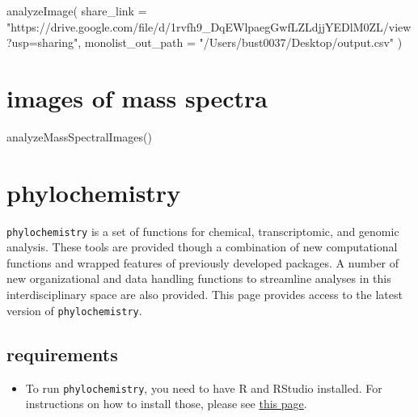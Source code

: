\documentclass[
]{krantz}
\newenvironment{Shaded}{\begin{snugshade}}{\end{snugshade}}
\newcommand{\AttributeTok}[1]{\textcolor[rgb]{0.77,0.63,0.00}{#1}}
\newcommand{\FunctionTok}[1]{\textcolor[rgb]{0.00,0.00,0.00}{#1}}
\newcommand{\NormalTok}[1]{#1}
\newcommand{\StringTok}[1]{\textcolor[rgb]{0.31,0.60,0.02}{#1}}
\providecommand{\tightlist}{%
  \setlength{\itemsep}{0pt}\setlength{\parskip}{0pt}}
\begin{document}
\begin{Shaded}
\begin{Highlighting}[]
\FunctionTok{analyzeImage}\NormalTok{(}
  \AttributeTok{share\_link =} \StringTok{"https://drive.google.com/file/d/1rvfh9\_DqEWlpaegGwfLZLdjjYEDlM0ZL/view?usp=sharing"}\NormalTok{,}
  \AttributeTok{monolist\_out\_path =} \StringTok{"/Users/bust0037/Desktop/output.csv"}
\NormalTok{)}
\end{Highlighting}
\end{Shaded}

\hypertarget{images-of-mass-spectra}{%
\section{images of mass spectra}\label{images-of-mass-spectra}}

\begin{Shaded}
\begin{Highlighting}[]
\FunctionTok{analyzeMassSpectralImages}\NormalTok{()}
\end{Highlighting}
\end{Shaded}

\hypertarget{phylochemistry-1}{%
\section{phylochemistry}\label{phylochemistry-1}}

\texttt{phylochemistry} is a set of functions for chemical, transcriptomic, and genomic analysis. These tools are provided though a combination of new computational functions and wrapped features of previously developed packages. A number of new organizational and data handling functions to streamline analyses in this interdisciplinary space are also provided. This page provides access to the latest version of \texttt{phylochemistry}.

\hypertarget{requirements}{%
\subsection{requirements}\label{requirements}}

\begin{itemize}
\tightlist
\item
  To run \texttt{phylochemistry}, you need to have R and RStudio installed. For instructions on how to install those, please see \href{https://thebustalab.github.io/R_For_Chemists/installation.html}{this page}.
\end{itemize}
\end{document}
